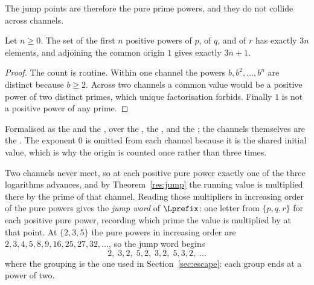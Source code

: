 The jump points are therefore the pure prime powers, and they do not collide
across channels.

\begin{theorem}\label{res:count}
Let $n\ge0$.  The set of the first $n$ positive powers of $p$, of $q$, and of
$r$ has exactly $3n$ elements, and adjoining the common origin $1$ gives
exactly $3n+1$.
\end{theorem}

\begin{proof}
The count is routine.  Within one channel the powers $b,b^{2},\ldots,b^{n}$ are distinct because
$b\ge2$.  Across two channels a common value would be a positive power of two
distinct primes, which unique factorisation forbids.  Finally $1$ is not a
positive power of any prime.
\end{proof}

\noindent Formalised as the
 and the
, over the
, the
, and the
; the channels themselves are the
.  The exponent $0$ is omitted from each channel because it is the
shared initial value, which is why the origin is counted once rather than three
times.

Two channels never meet, so at each positive pure power exactly one of the three
logarithms advances, and by Theorem~\ref{res:jump} the running value is
multiplied there by the prime of that channel.  Reading those multipliers in
increasing order of the pure powers gives the \emph{jump word} of $\Lprefix$:
one letter from $\{p,q,r\}$ for each positive pure power, recording which prime
the value is multiplied by at that point.  At $\{2,3,5\}$ the pure powers in
increasing order are $2,3,4,5,8,9,16,25,27,32,\ldots$, so the jump word begins
\[
 2,\;3,2,\;5,2,\;3,2,\;5,3,2,\;\ldots
\]
where the grouping is the one used in Section~\ref{sec:escape}: each group ends
at a power of two.


